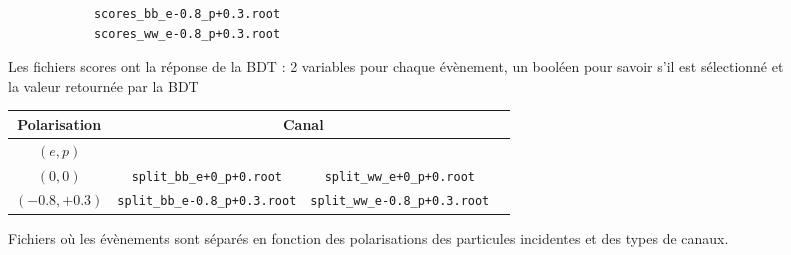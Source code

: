 
\begin{figure}[!ht]
	\centering
	\begin{lstlisting}
			scores_bb_e-0.8_p+0.3.root
			scores_ww_e-0.8_p+0.3.root
	\end{lstlisting}
	\caption{Les fichiers scores ont la réponse de la BDT : 2 variables pour chaque évènement, un booléen pour savoir s'il est sélectionné et la valeur retournée par la BDT}
	\label{files:scores}
\end{figure}

\begin{figure}[h!]
	\centering
	\begin{tabular}{ | c | c | c | c | }
		\hline
		Polarisation & \multicolumn{2}{c|}{Canal} \\
		\hline
		$(e,p)$ & \bb &  \WW \\
		\hline
		$(0,0)$ & \verb|split_bb_e+0_p+0.root| & \verb|split_ww_e+0_p+0.root| \\
		\hline \cline{2-3}
		$(-0.8, +0.3)$ & \verb|split_bb_e-0.8_p+0.3.root| & \verb|split_ww_e-0.8_p+0.3.root| \\
		\hline
	\end{tabular}
	\label{files:split}
	\caption{Fichiers où les évènements sont séparés en fonction des polarisations des particules incidentes et des types de canaux.}
\end{figure}